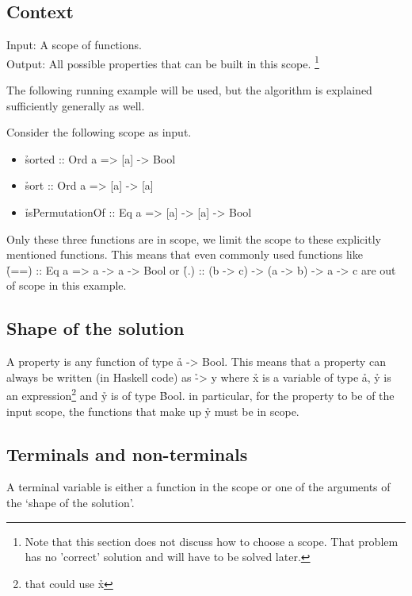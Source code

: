 \documentclass[a4paper, 11pt]{article}
\begin{document}
\subsection{Context}

Input: A scope of functions.\\
Output: All possible properties that can be built in this scope.
\footnote{
  Note that this section does not discuss how to choose a scope.
  That problem has no 'correct' solution and will have to be solved later.
}

The following running example will be used, but the algorithm is explained sufficiently generally as well.

Consider the following scope as input.

\begin{itemize}
  \item \h{sorted :: Ord a => [a] -> Bool}
  \item \h{sort :: Ord a => [a] -> [a]}
  \item \h{isPermutationOf :: Eq a => [a] -> [a] -> Bool}
\end{itemize}

Only these three functions are in scope, we limit the scope to these explicitly mentioned functions.
This means that even commonly used functions like\\ \h{(==) :: Eq a => a -> a -> Bool} or \h{(.) :: (b -> c) -> (a -> b) -> a -> c} are out of scope in this example.

\subsection{Shape of the solution}

A property is any function of type \h{a -> Bool}.
This means that a property can always be written (in Haskell code) as \h{\x -> y} where \h{x} is a variable of type \h{a}, \h{y} is an expression\footnote{that could use \h{x}} and \h{y} is of type \h{Bool}.
in particular, for the property to be of the input scope, the functions that make up \h{y} must be in scope.

\subsection{Terminals and non-terminals}

\begin{de}
  A terminal variable is either a function in the scope or one of the arguments of the `shape of the solution'.
\end{de}
\end{document}
